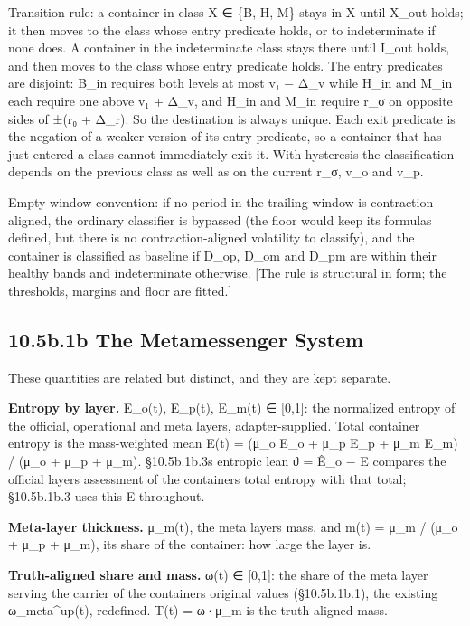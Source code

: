 \documentclass[
]{article}
\begin{document}
Transition rule: a container in class X ∈ \{B, H, M\} stays in X until
X\_out holds; it then moves to the class whose entry predicate holds, or
to indeterminate if none does. A container in the indeterminate class
stays there until I\_out holds, and then moves to the class whose entry
predicate holds. The entry predicates are disjoint: B\_in requires both
levels at most v₁ − Δ\_v while H\_in and M\_in each require one above v₁
+ Δ\_v, and H\_in and M\_in require r\_σ on opposite sides of ±(r₀ +
Δ\_r). So the destination is always unique. Each exit predicate is the
negation of a weaker version of its entry predicate, so a container that
has just entered a class cannot immediately exit it. With hysteresis the
classification depends on the previous class as well as on the current
r\_σ, v\_o and v\_p.

Empty-window convention: if no period in the trailing window is
contraction-aligned, the ordinary classifier is bypassed (the floor
would keep its formulas defined, but there is no contraction-aligned
volatility to classify), and the container is classified as baseline if
D\_op, D\_om and D\_pm are within their healthy bands and indeterminate
otherwise. {[}The rule is structural in form; the thresholds, margins
and floor are fitted.{]}

\hypertarget{b.1b-the-metamessenger-system}{%
\subsection{10.5b.1b The Metamessenger
System}\label{b.1b-the-metamessenger-system}}

These quantities are related but distinct, and they are kept separate.

\textbf{Entropy by layer.} E\_o(t), E\_p(t), E\_m(t) ∈ {[}0,1{]}: the
normalized entropy of the official, operational and meta layers,
adapter-supplied. Total container entropy is the mass-weighted mean E(t)
= (μ\_o E\_o + μ\_p E\_p + μ\_m E\_m) / (μ\_o + μ\_p + μ\_m).
§10.5b.1b.3\textquotesingle s entropic lean ϑ = Ê\_o − E compares the
official layer\textquotesingle s assessment of the
container\textquotesingle s total entropy with that total; §10.5b.1b.3
uses this E throughout.

\textbf{Meta-layer thickness.} μ\_m(t), the meta layer\textquotesingle s
mass, and m(t) = μ\_m / (μ\_o + μ\_p + μ\_m), its share of the
container: how large the layer is.

\textbf{Truth-aligned share and mass.} ω(t) ∈ {[}0,1{]}: the share of
the meta layer serving the carrier of the container\textquotesingle s
original values (§10.5b.1b.1), the existing ω\_meta\^{}up(t), redefined.
T(t) = ω·μ\_m is the truth-aligned mass.
\end{document}

